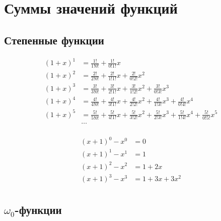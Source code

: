 
\section{Суммы значений функций}

\subsection{Степенные функции}

\begin{equation*}\begin{aligned}
(1 + x)^1 &=
  \frac{1!}{1!0!} 
+ \frac{1!}{0!1!} x
\\
(1 + x)^2 &= 
  \frac{2!}{2!0!} 
+ \frac{2!}{1!1!} x 
+ \frac{2!}{0!2!} x^2
\\
(1 + x)^3 &=
  \frac{3!}{3!0!} 
+ \frac{3!}{2!1!} x 
+ \frac{3!}{1!2!} x^2 
+ \frac{3!}{0!3!} x^3
\\
(1 + x)^4 &=
  \frac{4!}{4!0!} 
+ \frac{4!}{3!1!} x 
+ \frac{4!}{2!2!} x^2 
+ \frac{4!}{1!3!} x^3 
+ \frac{4!}{0!4!} x^4
\\
(1 + x)^5 &=
  \frac{5!}{5!0!} 
+ \frac{5!}{4!1!} x 
+ \frac{5!}{3!2!} x^2 
+ \frac{5!}{2!3!} x^3 
+ \frac{5!}{1!4!} x^4
+ \frac{5!}{0!5!} x^5
\\
&\ldots
\\
\end{aligned}\end{equation*}

\begin{equation*}\begin{aligned}
(x + 1)^0 - x^0 &= 0 \\
(x + 1)^1 - x^1 &= 1 \\
(x + 1)^2 - x^2 &= 1 + 2x \\
(x + 1)^3 - x^3 &= 1 + 3x + 3x^2 \\
\end{aligned}\end{equation*}

\subsection{$\omega_0$-функции}

